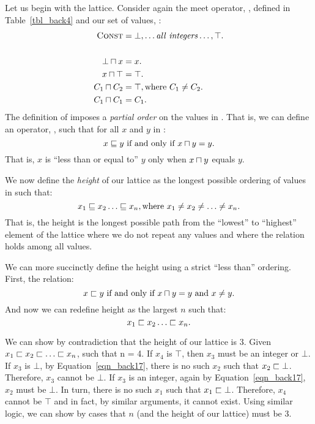 \documentclass[12pt]{report}
\begin{document}
Let us begin with the lattice. Consider again the meet operator, \lub,
defined in Table~\ref{tbl_back4} and our set of values, \setLC:
\begin{align*}
  \setLC &= \bot, \dots \mathit{all\ integers} \dots, \top. \\\\
  \bot \lub x &= x. \\
  x \lub \top &= \top.\\
  C_1 \lub C_2 &= \top, \text{where}\ C_1 \neq C_2.\\
  C_1 \lub C_1 &= C_1.
\end{align*}
The definition of \lub imposes a \emph{partial order} on the values
in \setLC. That is, we can define an operator, \sqlte, such that
for all $x$ and $y$ in \setLC:
\begin{equation}
  x \sqlte y\ \text{if and only if}\ x \lub y = y.
  \label{eqn_back9}
\end{equation}
That is, $x$ is ``less than or equal to'' $y$ only when $x \lub y$ equals
$y$.

We now define the \emph{height} of our lattice as the
longest possible ordering of values in \setLC such that:
\begin{equation}
  x_1 \sqlte x_2 \dots \sqlte x_n, \text{where}\ x_1 \neq x_2 \neq \dots \neq x_n.
  \label{eqn_back10}
\end{equation}
That is, the height is the longest possible path from the ``lowest''
to ``highest'' element of the lattice where we do not repeat any
values and where the \sqlte relation holds among all values.

We can more succinctly define the height using a strict ``less than''
ordering. First, the \sqlt relation:
\begin{equation}
  x \sqlt y\ \text{if and only if}\ x \lub y = y\ \text{and}\ x \neq y.
\end{equation}
And now we can redefine height as the largest $n$ such that:
\begin{equation}
  x_1 \sqlt x_2 \dots \sqlt x_n.
  \label{eqn_back17}
\end{equation}

We can show by contradiction that the height of our lattice is
3. Given $x_1 \sqlt x_2 \sqlt \dots \sqlt x_n$, such that n = 4. If
$x_4$ is $\top$, then $x_3$ must be an integer or $\bot$. If $x_3$ is
$\bot$, by Equation~\eqref{eqn_back17}, there is no such $x_2$ such
that $x_2 \sqsubset \bot$. Therefore, $x_3$ cannot be $\bot$. If $x_3$ is
an integer, again by Equation~\eqref{eqn_back17}, $x_2$ must be
$\bot$. In turn, there is no such $x_1$ such that $x_1 \sqsubset
\bot$. Therefore, $x_4$ cannot be $\top$ and in fact, by similar
arguments, it cannot exist. Using similar logic, we can show by cases
that $n$ (and the height of our lattice) must be 3.
\end{document}
